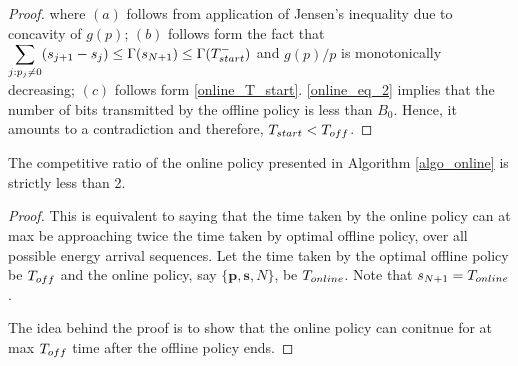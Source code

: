 \begin{proof}
where $(a)$ follows from application of Jensen's inequality due to concavity of $g(p)$; $(b)$ follows form the fact that $\displaystyle\sum_{j:p_j\neq 0}(s_{j+1}-s_{j})\le\TRx(s_{N+1})\le \TRx(T_{\mbox{\scriptsize{start}}}^-)$ and $g(p)/p$ is monotonically decreasing; $(c)$ follows form \eqref{online_T_start}. \eqref{online_eq_2} implies that the number of bits transmitted by the offline policy is less than $B_0$. Hence, it amounts to a contradiction and therefore, $T_{\mbox{\scriptsize{start}}}<T_{\mbox{\scriptsize{off}}}$.
\end{proof}
\begin{theorem}
The competitive ratio of the online policy presented in Algorithm \ref{algo_online} is strictly less than 2.
\end{theorem}
\begin{proof}
This is equivalent to saying that the time taken by the online policy can at max be approaching twice the time taken by optimal offline policy, over all possible energy arrival sequences. Let the time taken by the optimal offline policy be $T_{\mbox{\scriptsize{off}}}$ and the online policy, say $\{\bm{{p}},\bm{{s}},{N}\}$, be $T_{\mbox{\scriptsize{online}}}$. Note that $s_{N+1}=T_{\mbox{\scriptsize{online}}}$. 

The idea behind the proof is to show that the online policy can conitnue for at max $T_{\mbox{\scriptsize{off}}}$ time  after the offline policy ends.
%


\end{proof}
